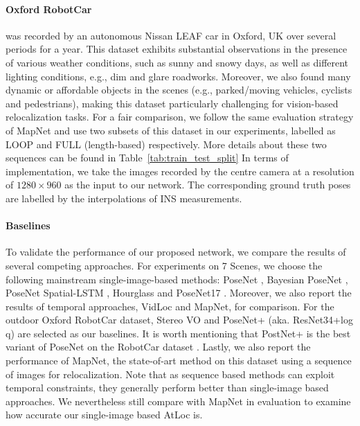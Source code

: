 \documentclass[letterpaper]{article}
\begin{document}
\paragraph{Oxford RobotCar} \cite{maddern20171}
was recorded by an autonomous Nissan LEAF car in Oxford, UK over several periods for a year. This dataset exhibits substantial observations in the presence of various weather conditions, such as sunny and snowy days, as well as different lighting conditions, e.g., dim and glare roadworks. Moreover, we also found many dynamic or affordable objects in the scenes (e.g., parked/moving vehicles, cyclists and pedestrians), making this dataset particularly challenging for vision-based relocalization tasks. For a fair comparison, we follow the same evaluation strategy of MapNet \cite{brahmbhatt2018geometry,xue2019local} and use two subsets of this dataset in our experiments, labelled as LOOP and FULL (length-based) respectively. More details about these two sequences can be found in Table~\ref{tab:train_test_split}
In terms of implementation, we take the images recorded by the centre camera at a resolution of $1280\times960$ as the input to our network. The corresponding ground truth poses are labelled by the interpolations of INS measurements.

\paragraph{Baselines}
To validate the performance of our proposed network, we compare the results of several competing approaches. For experiments on 7 Scenes, we choose the following mainstream single-image-based methods: PoseNet \cite{kendall2015posenet}, Bayesian PoseNet \cite{kendall2016modelling}, PoseNet Spatial-LSTM \cite{walch2017image}, Hourglass\cite{melekhov2017image} and PoseNet17 \cite{kendall2017geometric}. Moreover, we also report the results of temporal approaches, VidLoc\cite{clark2017vidloc} and MapNet, for comparison. For the outdoor Oxford RobotCar dataset, Stereo VO \cite{maddern20171} and PoseNet+ (aka. ResNet34+log q) \cite{brahmbhatt2018geometry} are selected as our baselines. It is worth mentioning that PostNet+ is the best variant of PoseNet \cite{kendall2015posenet} on the RobotCar dataset \cite{brahmbhatt2018geometry}. Lastly, we also report the performance of MapNet\cite{brahmbhatt2018geometry}, the state-of-art method on this dataset using a sequence of images for relocalization. Note that as sequence based methods can exploit temporal constraints, they generally perform better than single-image based approaches. We nevertheless still compare with MapNet in evaluation to examine how accurate our single-image based AtLoc is.
\end{document}
